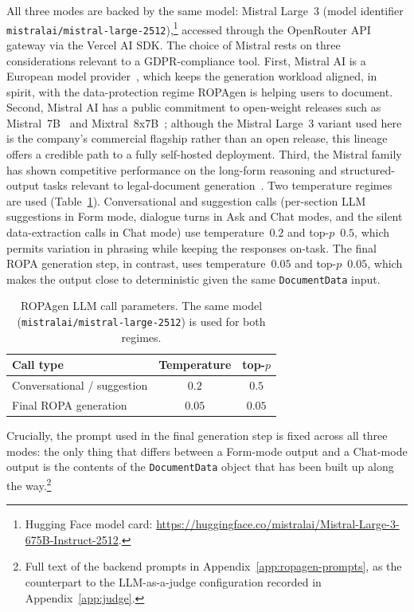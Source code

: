 All three modes are backed by the same model: Mistral Large~3 (model identifier \texttt{mistralai/mistral-large-2512}),\footnote{Hugging Face model card: \url{https://huggingface.co/mistralai/Mistral-Large-3-675B-Instruct-2512}.} accessed through the OpenRouter API gateway via the Vercel AI SDK. The choice of Mistral rests on three considerations relevant to a GDPR-compliance tool. First, Mistral AI is a European model provider~\cite{mistralAI}, which keeps the generation workload aligned, in spirit, with the data-protection regime ROPAgen is helping users to document. Second, Mistral AI has a public commitment to open-weight releases such as Mistral~7B~\cite{Jiang2023Mistral} and Mixtral~8x7B~\cite{Jiang2024Mixtral}; although the Mistral Large~3 variant used here is the company's commercial flagship rather than an open release, this lineage offers a credible path to a fully self-hosted deployment. Third, the Mistral family has shown competitive performance on the long-form reasoning and structured-output tasks relevant to legal-document generation~\cite{Jiang2023Mistral}. Two temperature regimes are used (Table~\ref{tab:ropagen-llm-params}). Conversational and suggestion calls (per-section LLM suggestions in Form mode, dialogue turns in Ask and Chat modes, and the silent data-extraction calls in Chat mode) use temperature~$0.2$ and top-$p$~$0.5$, which permits variation in phrasing while keeping the responses on-task. The final ROPA generation step, in contrast, uses temperature~$0.05$ and top-$p$~$0.05$, which makes the output close to deterministic given the same \texttt{DocumentData} input.

\begin{table}[htbp]
\centering
\caption{ROPAgen LLM call parameters. The same model
(\texttt{mistralai/mistral-large-2512}) is used for both regimes.}
\label{tab:ropagen-llm-params}
\begin{tabular}{@{}l c c@{}}
\toprule
Call type & Temperature & top-$p$ \\
\midrule
Conversational / suggestion & $0.2$  & $0.5$  \\
Final ROPA generation       & $0.05$ & $0.05$ \\
\bottomrule
\end{tabular}
\end{table} Crucially, the prompt used in the final generation step is fixed across all three modes: the only thing that differs between a Form-mode output and a Chat-mode output is the contents of the \texttt{DocumentData} object that has been built up along the way.\footnote{Full text of the backend prompts in Appendix~\ref{app:ropagen-prompts}, as the counterpart to the LLM-as-a-judge configuration recorded in Appendix~\ref{app:judge}.}

